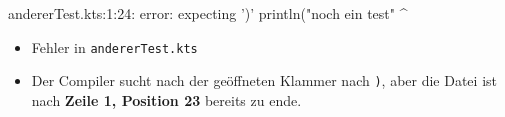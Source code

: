 \begin{frame}[fragile]
    \slidehead
    \pause
    \begin{commandshell}[][minted language=text]
        andererTest.kts:1:24: error: expecting ')'
        println("noch ein test"
                               ^
    \end{commandshell}
    \pause
    \begin{itemize}[<+->]
        \item Fehler in \texttt{andererTest.kts}
        \item Der Compiler sucht nach der geöffneten Klammer nach \texttt{)}, aber die Datei ist nach \textbf{Zeile 1, Position 23} bereits zu ende.
    \end{itemize}
\end{frame}

\subsection{}
\livecoding



